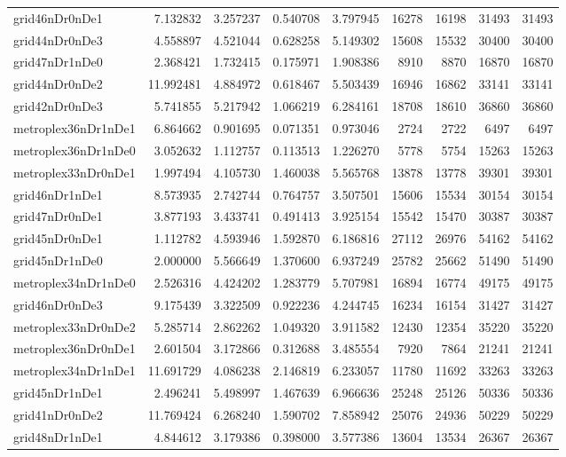 \begin{longtable}{|l|r|r|r|r|r|r|r|r|}
grid46nDr0nDe1 & 7.132832 & 3.257237 & 0.540708 & 3.797945 & 16278 & 16198 & 31493 & 31493 \\
grid44nDr0nDe3 & 4.558897 & 4.521044 & 0.628258 & 5.149302 & 15608 & 15532 & 30400 & 30400 \\
grid47nDr1nDe0 & 2.368421 & 1.732415 & 0.175971 & 1.908386 & 8910 & 8870 & 16870 & 16870 \\
grid44nDr0nDe2 & 11.992481 & 4.884972 & 0.618467 & 5.503439 & 16946 & 16862 & 33141 & 33141 \\
grid42nDr0nDe3 & 5.741855 & 5.217942 & 1.066219 & 6.284161 & 18708 & 18610 & 36860 & 36860 \\
metroplex36nDr1nDe1 & 6.864662 & 0.901695 & 0.071351 & 0.973046 & 2724 & 2722 & 6497 & 6497 \\
metroplex36nDr1nDe0 & 3.052632 & 1.112757 & 0.113513 & 1.226270 & 5778 & 5754 & 15263 & 15263 \\
metroplex33nDr0nDe1 & 1.997494 & 4.105730 & 1.460038 & 5.565768 & 13878 & 13778 & 39301 & 39301 \\
grid46nDr1nDe1 & 8.573935 & 2.742744 & 0.764757 & 3.507501 & 15606 & 15534 & 30154 & 30154 \\
grid47nDr0nDe1 & 3.877193 & 3.433741 & 0.491413 & 3.925154 & 15542 & 15470 & 30387 & 30387 \\
grid45nDr0nDe1 & 1.112782 & 4.593946 & 1.592870 & 6.186816 & 27112 & 26976 & 54162 & 54162 \\
grid45nDr1nDe0 & 2.000000 & 5.566649 & 1.370600 & 6.937249 & 25782 & 25662 & 51490 & 51490 \\
metroplex34nDr1nDe0 & 2.526316 & 4.424202 & 1.283779 & 5.707981 & 16894 & 16774 & 49175 & 49175 \\
grid46nDr0nDe3 & 9.175439 & 3.322509 & 0.922236 & 4.244745 & 16234 & 16154 & 31427 & 31427 \\
metroplex33nDr0nDe2 & 5.285714 & 2.862262 & 1.049320 & 3.911582 & 12430 & 12354 & 35220 & 35220 \\
metroplex36nDr0nDe1 & 2.601504 & 3.172866 & 0.312688 & 3.485554 & 7920 & 7864 & 21241 & 21241 \\
metroplex34nDr1nDe1 & 11.691729 & 4.086238 & 2.146819 & 6.233057 & 11780 & 11692 & 33263 & 33263 \\
grid45nDr1nDe1 & 2.496241 & 5.498997 & 1.467639 & 6.966636 & 25248 & 25126 & 50336 & 50336 \\
grid41nDr0nDe2 & 11.769424 & 6.268240 & 1.590702 & 7.858942 & 25076 & 24936 & 50229 & 50229 \\
grid48nDr1nDe1 & 4.844612 & 3.179386 & 0.398000 & 3.577386 & 13604 & 13534 & 26367 & 26367 \\

\end{longtable}
